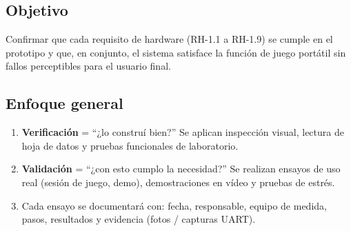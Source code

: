 \documentclass[11pt,a4paper]{article}
\begin{document}
\subsection{Objetivo}
Confirmar que cada requisito de hardware (RH-1.1 a RH-1.9) se
cumple en el prototipo y que, en conjunto, el sistema satisface la
función de juego portátil sin fallos perceptibles para el usuario
final.

\subsection{Enfoque general}
\begin{enumerate}[label=\alph*)]
  \item \textbf{Verificación} = “¿lo construí bien?”  
        Se aplican inspección visual, lectura de hoja de datos y pruebas
        funcionales de laboratorio.
  \item \textbf{Validación} = “¿con esto cumplo la necesidad?”  
        Se realizan ensayos de uso real (sesión de juego, demo),
        demostraciones en vídeo y pruebas de estrés.
  \item Cada ensayo se documentará con: fecha, responsable, equipo de
        medida, pasos, resultados y evidencia (fotos / capturas UART).
\end{enumerate}
\end{document}
